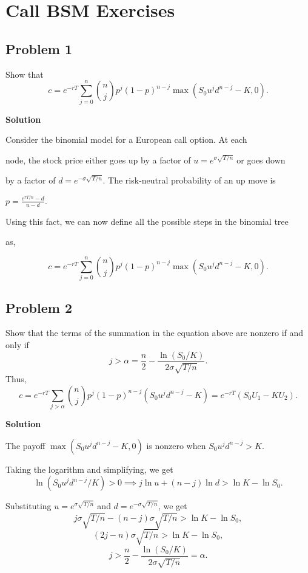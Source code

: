 \documentclass{article}
\begin{document}
\section{Call BSM Exercises}

\subsection*{Problem 1}
Show that 
\[
c = e^{-rT} \sum_{j=0}^{n} \binom{n}{j} p^j (1-p)^{n-j} \max(S_0 u^j d^{n-j} - K, 0).
\]

\textbf{Solution}

Consider the binomial model for a European call option. At each 

node, the stock price either goes up by a factor of $u = e^{\sigma \sqrt{T/n}}$ or goes down 

by a factor of $d = e^{-\sigma \sqrt{T/n}}$. The risk-neutral probability of an up move is 

$p = \frac{e^{rT/n} - d}{u - d}$.

\vspace{\baselineskip}

Using this fact, we can now define all the possible steps in the binomial tree 

as,

\[
c = e^{-rT} \sum_{j=0}^{n} \binom{n}{j} p^j (1-p)^{n-j} \max(S_0 u^j d^{n-j} - K, 0).
\]

\subsection*{Problem 2}
Show that the terms of the summation in the equation above are nonzero if and only if 
\[
j > \alpha = \frac{n}{2} - \frac{\ln(S_0/K)}{2\sigma \sqrt{T/n}}.
\]
Thus,
\[
c = e^{-rT} \sum_{j > \alpha} \binom{n}{j} p^j (1-p)^{n-j} (S_0 u^j d^{n-j} - K) = e^{-rT} (S_0 U_1 - K U_2).
\]

\textbf{Solution}

The payoff $\max(S_0 u^j d^{n-j} - K, 0)$ is nonzero when $S_0 u^j d^{n-j} > K$. 

Taking the logarithm and simplifying, we get
\[
\ln(S_0 u^j d^{n-j} / K) > 0 \implies j \ln u + (n-j) \ln d > \ln K - \ln S_0.
\]

Substituting $u = e^{\sigma \sqrt{T/n}}$ and $d = e^{-\sigma \sqrt{T/n}}$, we get
\[
j \sigma \sqrt{T/n} - (n-j) \sigma \sqrt{T/n} > \ln K - \ln S_0,
\]
\[
(2j - n) \sigma \sqrt{T/n} > \ln K - \ln S_0,
\]
\[
j > \frac{n}{2} - \frac{\ln(S_0/K)}{2\sigma \sqrt{T/n}} = \alpha.
\]
\end{document}
